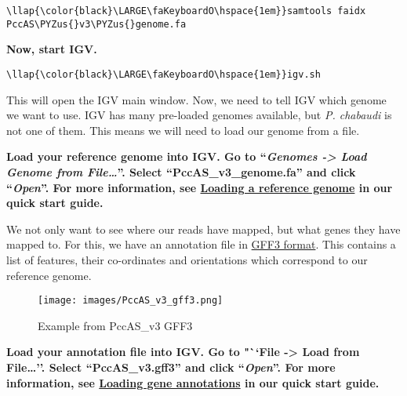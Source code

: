 \documentclass[11pt]{article}
\def\PYZus{\char`\_}
\begin{document}
\begin{terminalinput}
\begin{Verbatim}[commandchars=\\\{\}]
\llap{\color{black}\LARGE\faKeyboardO\hspace{1em}}samtools faidx PccAS\PYZus{}v3\PYZus{}genome.fa
\end{Verbatim}
\end{terminalinput}



    \textbf{Now, start IGV.}





\begin{terminalinput}
\begin{Verbatim}[commandchars=\\\{\}]
\llap{\color{black}\LARGE\faKeyboardO\hspace{1em}}igv.sh
\end{Verbatim}
\end{terminalinput}



    This will open the IGV main window. Now, we need to tell IGV which
genome we want to use. IGV has many pre-loaded genomes available, but
\textit{P. chabaudi} is not one of them. This means we will need to load
our genome from a file.

\textbf{Load your reference genome into IGV. Go to ``\textit{Genomes
-\textgreater{} Load Genome from File\ldots{}}''. Select
``PccAS\_v3\_genome.fa'' and click ``\textit{Open}''. For more
information, see
\href{https://github.com/sanger-pathogens/pathogen-informatics-training/blob/master/Notebooks/IGV/index.ipynb}{Loading
a reference genome} in our quick start guide.}

We not only want to see where our reads have mapped, but what genes they
have mapped to. For this, we have an annotation file in
\href{https://www.ensembl.org/info/website/upload/gff3.html}{GFF3
format}. This contains a list of features, their co-ordinates and
orientations which correspond to our reference genome.

    \begin{figure}[!h]
\centering
\texttt{[image: images/PccAS\_v3\_gff3.png]}
\caption{Example from PccAS\_v3 GFF3}
\end{figure}

    \textbf{Load your annotation file into IGV. Go to "``File
-\textgreater{} Load from File\ldots{}''. Select ``PccAS\_v3.gff3'' and
click ``\textit{Open}''. For more information, see
\href{https://github.com/sanger-pathogens/pathogen-informatics-training/blob/master/Notebooks/IGV/index.ipynb}{Loading
gene annotations} in our quick start guide.}
\end{document}
